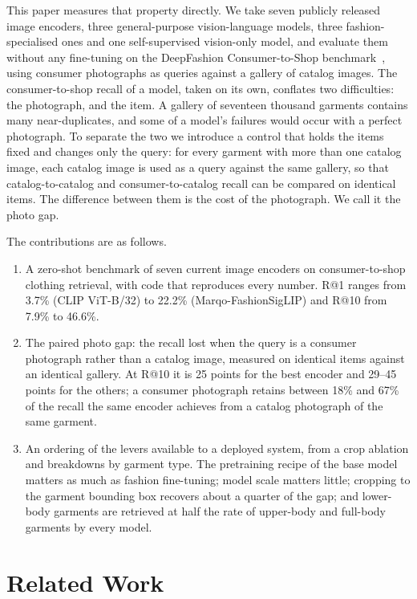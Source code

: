 \documentclass[10pt,twocolumn,letterpaper]{article}
\makeatletter
\newcommand{\recall}[1]{R@#1}
\makeatother
\begin{document}
This paper measures that property directly. We take seven publicly released image encoders, three general-purpose vision-language models, three fashion-specialised ones and one self-supervised vision-only model, and evaluate them without any fine-tuning on the DeepFashion Consumer-to-Shop benchmark~\cite{liu2016deepfashion}, using consumer photographs as queries against a gallery of catalog images. The consumer-to-shop recall of a model, taken on its own, conflates two difficulties: the photograph, and the item. A gallery of seventeen thousand garments contains many near-duplicates, and some of a model's failures would occur with a perfect photograph. To separate the two we introduce a control that holds the items fixed and changes only the query: for every garment with more than one catalog image, each catalog image is used as a query against the same gallery, so that catalog-to-catalog and consumer-to-catalog recall can be compared on identical items. The difference between them is the cost of the photograph. We call it the photo gap.

The contributions are as follows.
\begin{enumerate}[leftmargin=*,itemsep=1pt,topsep=2pt]
  \item A zero-shot benchmark of seven current image encoders on consumer-to-shop clothing retrieval, with code that reproduces every number. \recall{1} ranges from 3.7\% (CLIP ViT-B/32) to 22.2\% (Marqo-FashionSigLIP) and \recall{10} from 7.9\% to 46.6\%.
  \item The paired photo gap: the recall lost when the query is a consumer photograph rather than a catalog image, measured on identical items against an identical gallery. At \recall{10} it is 25 points for the best encoder and 29--45 points for the others; a consumer photograph retains between 18\% and 67\% of the recall the same encoder achieves from a catalog photograph of the same garment.
  \item An ordering of the levers available to a deployed system, from a crop ablation and breakdowns by garment type. The pretraining recipe of the base model matters as much as fashion fine-tuning; model scale matters little; cropping to the garment bounding box recovers about a quarter of the gap; and lower-body garments are retrieved at half the rate of upper-body and full-body garments by every model.
\end{enumerate}

\section{Related Work}
\end{document}
